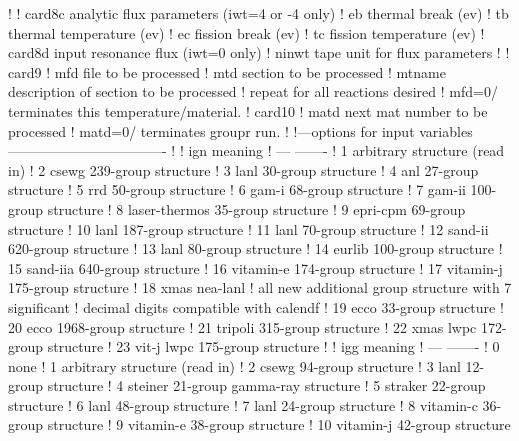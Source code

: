 \begin{ccode}
   !            
   ! card8c     analytic flux parameters (iwt=4 or -4 only)
   !    eb      thermal break (ev)
   !    tb      thermal temperature (ev)
   !    ec      fission break (ev)
   !    tc      fission temperature (ev)
   ! card8d     input resonance flux (iwt=0 only)
   !    ninwt   tape unit for flux parameters
   !
   ! card9
   !    mfd     file to be processed
   !    mtd     section to be processed
   !    mtname  description of section to be processed
   !          repeat for all reactions desired
   !          mfd=0/ terminates this temperature/material.
   ! card10
   !    matd    next mat number to be processed
   !            matd=0/ terminates groupr run.
   !
   !---options for input variables----------------------------------
   !
   !     ign          meaning
   !     ---          -------
   !      1           arbitrary structure (read in)
   !      2           csewg 239-group structure
   !      3           lanl 30-group structure
   !      4           anl 27-group structure
   !      5           rrd 50-group structure
   !      6           gam-i 68-group structure
   !      7           gam-ii 100-group structure
   !      8           laser-thermos 35-group structure
   !      9           epri-cpm 69-group structure
   !     10           lanl 187-group structure
   !     11           lanl 70-group structure
   !     12           sand-ii 620-group structure
   !     13           lanl 80-group structure
   !     14           eurlib 100-group structure
   !     15           sand-iia 640-group structure
   !     16           vitamin-e 174-group structure
   !     17           vitamin-j 175-group structure
   !     18           xmas nea-lanl
   !     all new additional group structure with 7 significant
   !     decimal digits compatible with calendf
   !     19           ecco  33-group structure
   !     20           ecco 1968-group structure
   !     21           tripoli 315-group structure
   !     22           xmas lwpc 172-group structure
   !     23           vit-j lwpc 175-group structure
   !
   !     igg          meaning
   !     ---          -------
   !      0           none
   !      1           arbitrary structure (read in)
   !      2           csewg 94-group structure
   !      3           lanl 12-group structure
   !      4           steiner 21-group gamma-ray structure
   !      5           straker 22-group structure
   !      6           lanl 48-group structure
   !      7           lanl 24-group structure
   !      8           vitamin-c 36-group structure
   !      9           vitamin-e 38-group structure
   !     10           vitamin-j 42-group structure

\end{ccode}
